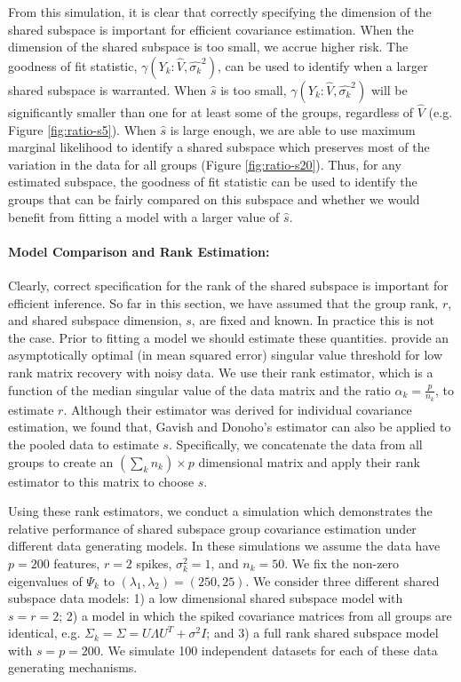 \documentclass[12pt]{article}
\begin{document}
From this simulation, it is clear that correctly specifying the
dimension of the shared subspace is important for efficient covariance
estimation.  When the dimension of the shared subspace is too small,
we accrue higher risk.  The goodness of fit statistic,
$\gamma(Y_k: \hat{V}, \hat{\sigma_k}^2)$, can be used to identify when
a larger shared subspace is warranted.  When $\hat{s}$ is too small,
$\gamma(Y_k: \hat{V}, \hat{\sigma_k}^2)$ will be significantly smaller
than one for at least some of the groups, regardless of $\hat{V}$
(e.g. Figure \ref{fig:ratio-s5}).  When $\hat{s}$ is large enough, we
are able to use maximum marginal likelihood to identify a shared
subspace which preserves most of the variation in the data for all
groups (Figure \ref{fig:ratio-s20}).  Thus, for any estimated
subspace, the goodness of fit statistic can be used to identify the
groups that can be fairly compared on this subspace and whether we
would benefit from fitting a model with a larger value of $\hat{s}$.

\paragraph{Model Comparison and Rank Estimation:}

Clearly, correct specification for the rank of the shared subspace is
important for efficient inference.  So far in this section, we have
assumed that the group rank, $r$, and shared subspace dimension, $s$,
are fixed and known.  In practice this is not the case.  Prior to
fitting a model we should estimate these quantities.
\citet{Gavish2014} provide an asymptotically optimal (in mean squared
error) singular value threshold for low rank matrix recovery with
noisy data.  We use their rank estimator, which is a function of the
median singular value of the data matrix and the ratio
$\alpha_k =\frac{p}{n_k}$, to estimate $r$.  Although their estimator
was derived for individual covariance estimation, we found that,
Gavish and Donoho's estimator can also be applied to the pooled data
to estimate $s$.  Specifically, we concatenate the data from all
groups to create an $(\sum_k n_k) \times p$ dimensional matrix and
apply their rank estimator to this matrix to choose $s$.

Using these rank estimators, we conduct a simulation which
demonstrates the relative performance of shared subspace group
covariance estimation under different data generating models.  In
these simulations we assume the data have $p=200$ features, $r=2$
spikes, $\sigma^2_k=1$, and $n_k = 50$.  We fix the non-zero eigenvalues of
$\Psi_k$ to $(\lambda_1, \lambda_2) = (250, 25)$.  We consider three
different shared subspace data models: 1) a low dimensional shared
subspace model with $s=r=2$; 2) a model in which the spiked covariance
matrices from all groups are identical, e.g.
$\Sigma_k = \Sigma = U\Lambda U^T + \sigma^2I$; and 3) a full rank
shared subspace model with $s=p=200$.  We simulate 100 independent
datasets for each of these data generating mechanisms.
\end{document}
